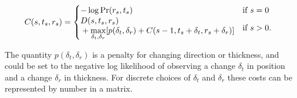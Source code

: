 \begin{align}
C(s, t_s, r_s) &=  \begin{cases}
-\log \Pr(r_s, t_s) & \text{if } s = 0\\
   \begin{aligned}
   & D(s, t_s, r_s) \\ 
   & + \displaystyle\max_{\delta_t,\delta_r} [p(\delta_t, \delta_r)+C(s-1, t_s+\delta_t, r_s+\delta_r)]
   \end{aligned} & \text{if } s > 0.\\
\end{cases}
\end{align}

The quantity $p(\delta_t, \delta_r)$ is a penalty for changing direction or thickness, and could be set to the negative log likelihood of observing a change $\delta_t$ in position and a change $\delta_r$ in thickness.  For discrete choices of $\delta_t$ and $\delta_r$ these costs can be represented by number in a matrix.




